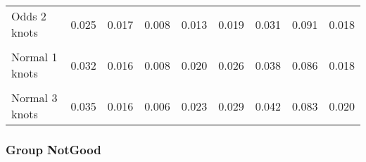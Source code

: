 \documentclass[
]{article}
\begin{document}
\begin{table}[H]
{\begin{tabular}[t]{lrrrrrrrr}
Odds 2 knots & 0.025 & 0.017 & 0.008 & 0.013 & 0.019 & 0.031 & 0.091 & 0.018\\
\cellcolor{gray!10}{Odds 3 knots} & \cellcolor{gray!10}{0.031} & \cellcolor{gray!10}{0.019} & \cellcolor{gray!10}{0.006} & \cellcolor{gray!10}{0.017} & \cellcolor{gray!10}{0.024} & \cellcolor{gray!10}{0.041} & \cellcolor{gray!10}{0.084} & \cellcolor{gray!10}{0.024}\\
Normal 1 knots & 0.032 & 0.016 & 0.008 & 0.020 & 0.026 & 0.038 & 0.086 & 0.018\\
\cellcolor{gray!10}{Normal 2 knots} & \cellcolor{gray!10}{0.027} & \cellcolor{gray!10}{0.016} & \cellcolor{gray!10}{0.008} & \cellcolor{gray!10}{0.016} & \cellcolor{gray!10}{0.021} & \cellcolor{gray!10}{0.031} & \cellcolor{gray!10}{0.093} & \cellcolor{gray!10}{0.015}\\
Normal 3 knots & 0.035 & 0.016 & 0.006 & 0.023 & 0.029 & 0.042 & 0.083 & 0.020\\
\bottomrule
\end{tabular}}
\end{table}

\clearpage

\subsubsection{Group NotGood}\label{group-notgood}
\end{document}
